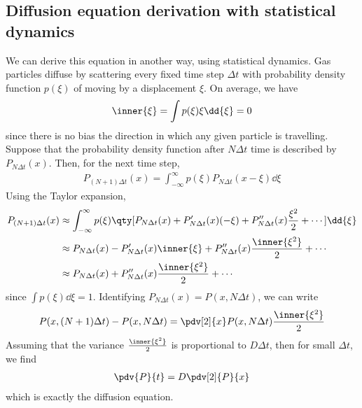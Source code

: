\subsection{Diffusion equation derivation with statistical dynamics}
We can derive this equation in another way, using statistical dynamics.
Gas particles diffuse by scattering every fixed time step $\Delta t$ with probability density function $p(\xi)$ of moving by a displacement $\xi$.
On average, we have
\begin{align*}
	\inner{\xi} = \int p(\xi) \xi \dd{\xi} = 0
\end{align*}
since there is no bias the direction in which any given particle is travelling.
Suppose that the probability density function after $N\Delta t$ time is described by $P_{N \Delta t}(x)$.
Then, for the next time step,
\begin{align*}
	P_{(N+1)\Delta t}(x) = \int_{-\infty}^\infty p(\xi) P_{N \Delta t}(x - \xi) \dd{\xi}
\end{align*}
Using the Taylor expansion,
\begin{align*}
	P_{(N+1)\Delta t}(x) & \approx \int_{-\infty}^\infty p(\xi) \qty[P_{N \Delta t}(x) + P_{N \Delta t}'(x)(-\xi) + P_{N \Delta t}''(x)\frac{\xi^2}{2} + \cdots] \dd{\xi} \\
	& \approx P_{N \Delta t}(x) - P_{N \Delta t}'(x) \inner{\xi} + P_{N \Delta t}''(x) \frac{\inner{\xi^2}}{2} + \cdots \\
	& \approx P_{N \Delta t}(x) + P_{N \Delta t}''(x) \frac{\inner{\xi^2}}{2} + \cdots
\end{align*}
since $\int p(\xi) \dd{\xi} = 1$.
Identifying $P_{N \Delta t}(x) = P(x, N\Delta t)$, we can write
\begin{align*}
	P(x, (N+1)\Delta t) - P(x, N \Delta t) = \pdv[2]{x} P(x, N\Delta t) \frac{\inner{\xi^2}}{2}
\end{align*}
Assuming that the variance $\frac{\inner{\xi^2}}{2}$ is proportional to $D \Delta t$, then for small $\Delta t$, we find
\begin{align*}
	\pdv{P}{t} = D \pdv[2]{P}{x}
\end{align*}
which is exactly the diffusion equation.

